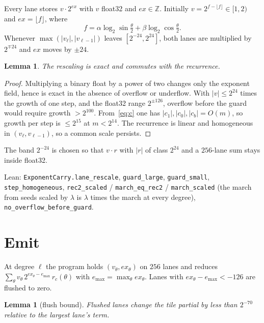 \documentclass[11pt,a4paper]{article}
\newtheorem{lemma}[theorem]{Lemma}
\newcommand{\emax}{e_{\max}}
\numberwithin{equation}{section}
\begin{document}
Every lane stores $v\cdot 2^{ex}$ with $v$ float32 and $ex\in\mathbb{Z}$.
Initially $v=2^{f-\lfloor f\rfloor}\in[1,2)$ and $ex=\lfloor f\rfloor$, where
\begin{equation}
\label{eq:f}
f=\alpha\log_2\sin\tfrac{\theta}{2}+\beta\log_2\cos\tfrac{\theta}{2}.
\end{equation}
Whenever $\max(\lvert v_\ell\rvert,\lvert v_{\ell-1}\rvert)$ leaves
$[2^{-24},2^{24}]$, both lanes are multiplied by $2^{\mp 24}$ and $ex$
moves by $\pm 24$.

\begin{lemma}
\label{lem:rescale}
The rescaling is exact and commutes with the recurrence.
\end{lemma}

\begin{proof}
Multiplying a binary float by a power of two changes only the exponent
field, hence is exact in the absence of overflow or underflow.  With
$\lvert v\rvert\le 2^{24}$ times the growth of one step, and the float32
range $2^{\pm 126}$, overflow before the guard would require growth
$>2^{100}$.  From~\eqref{eq:c} one has
$\lvert c_1\rvert,\lvert c_0\rvert,\lvert c_b\rvert=O(m)$, so growth per
step is $\le 2^{15}$ at $m<2^{14}$.  The recurrence is linear and
homogeneous in $(v_\ell,v_{\ell-1})$, so a common scale persists.
\end{proof}

The band $2^{-24}$ is chosen so that $v\cdot r$ with
$\lvert r\rvert$ of class $2^{24}$ and a $256$-lane sum stays inside
float32.

Lean: \texttt{ExponentCarry.lane\_rescale}, \texttt{guard\_large},
\texttt{guard\_small}, \texttt{step\_homogeneous}, \texttt{rec2\_scaled} /
\texttt{march\_eq\_rec2} / \texttt{march\_scaled} (the march from seeds
scaled by $\lambda$ is $\lambda$ times the march at every degree),
\texttt{no\_overflow\_before\_guard}.

\section{Emit}
\label{sec:emit}

At degree $\ell$ the program holds $(v_\theta,ex_\theta)$ on $256$ lanes and
reduces $\sum_\theta v_\theta\,2^{ex_\theta-\emax}\,r_c(\theta)$ with
$\emax=\max_\theta ex_\theta$.  Lanes with $ex_\theta-\emax<-126$ are flushed
to zero.

\begin{lemma}[flush bound]
\label{lem:flush}
Flushed lanes change the tile partial by less than $2^{-70}$ relative to
the largest lane's term.
\end{lemma}
\end{document}
